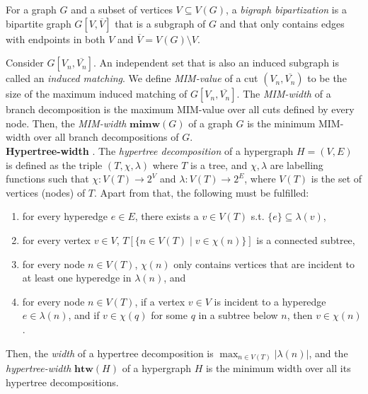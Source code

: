 For a graph $G$ and a subset of vertices $V \subseteq V(G)$, a {\em bigraph bipartization} is a bipartite graph $G[V, \overline{V}]$ that is a subgraph of $G$ and that only contains edges with endpoints in both $V$ and $\overline{V} = V(G) \setminus V$.

Consider $G[V_n, \overline{V_n}]$.
An independent set that is also an induced subgraph is called an {\em induced matching}.
We define {\em MIM-value} of a cut $(V_n, \overline{V_n})$ to be the size of the maximum induced matching of $G[V_n, \overline{V_n}]$.
The {\em MIM-width} of a branch decomposition is the maximum MIM-value over all cuts defined by every node.
Then, the {\em MIM-width} $\mathbf{mimw}(G)$ of a graph $G$ is the minimum MIM-width over all branch decompositions of $G$.\\

\noindent
\textbf{Hypertree-width} \cite{DBLP:journals/siamcomp/GottlobP04}.
The {\em hypertree decomposition} of a hypergraph $H=(V,E)$ is defined as the triple $(T, \chi, \lambda)$ where $T$ is a tree, and $\chi, \lambda$ are labelling functions such that  $\chi : V(T) \rightarrow 2^V$ and $\lambda : V(T) \rightarrow 2^E$, where $V(T)$ is the set of vertices (nodes) of $T$.
Apart from that, the following must be fulfilled:
\begin{enumerate}
	\item for every hyperedge $e \in E$, there exists a $v \in V(T)$ s.t. $\{e\} \subseteq \lambda(v)$,
	\item for every vertex $v \in V$, $T[\{ n \in V(T) \; | \; v \in \chi(n) \}]$ is a connected subtree,
	\item for every node $n \in V(T)$, $\chi(n)$ only contains vertices that are incident to at least one hyperedge in $\lambda(n)$, and
	\item for every node $n \in V(T)$, if a vertex $v \in V$ is incident to a hyperedge $e \in \lambda(n)$, and if $v \in \chi(q)$ for some $q$ in a subtree below $n$, then $v\in \chi(n)$.
\end{enumerate}
Then, the {\em width} of a hypertree decomposition is $\max_{n \in V(T)} |\lambda(n)|$, and the {\em hypertree-width} $\mathbf{htw}(H)$ of a hypergraph $H$ is the minimum width over all its hypertree decompositions. \\
